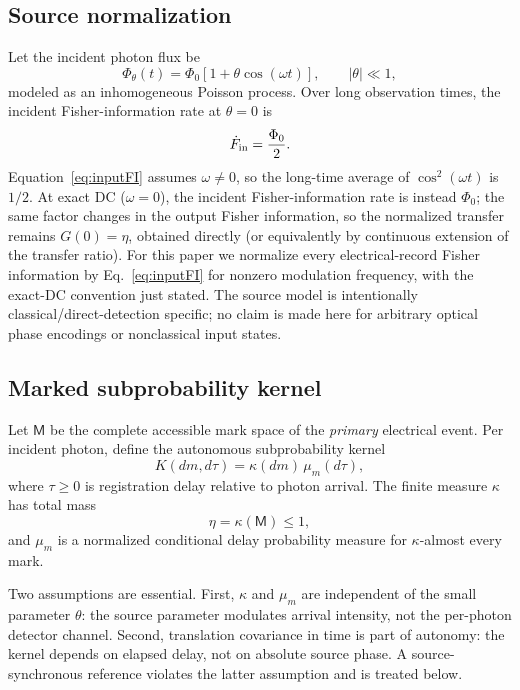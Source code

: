 \documentclass[aps,prapplied,preprint,nofootinbib]{revtex4-2}
\newcommand{\M}{\mathsf M}
\begin{document}
\subsection{Source normalization}

Let the incident photon flux be
\begin{equation}
\Phi_\theta(t)=\Phi_0[1+\theta\cos(\omega t)],\qquad |\theta|\ll1,
\label{eq:source}
\end{equation}
modeled as an inhomogeneous Poisson process. Over long observation times, the incident Fisher-information rate at $\theta=0$ is
\begin{equation}
\dot F_{\rm in}=\frac{\Phi_0}{2}.
\label{eq:inputFI}
\end{equation}
Equation~\eqref{eq:inputFI} assumes $\omega\ne0$, so the long-time average of $\cos^2(\omega t)$ is $1/2$. At exact DC ($\omega=0$), the incident Fisher-information rate is instead $\Phi_0$; the same factor changes in the output Fisher information, so the normalized transfer remains $G(0)=\eta$, obtained directly (or equivalently by continuous extension of the transfer ratio).
For this paper we normalize every electrical-record Fisher information by Eq.~\eqref{eq:inputFI} for nonzero modulation frequency, with the exact-DC convention just stated. The source model is intentionally classical/direct-detection specific; no claim is made here for arbitrary optical phase encodings or nonclassical input states.

\subsection{Marked subprobability kernel}

Let $\M$ be the complete accessible mark space of the \emph{primary} electrical event. Per incident photon, define the autonomous subprobability kernel
\begin{equation}
K(dm,d\tau)=\kappa(dm)\,\mu_m(d\tau),
\label{eq:kernel}
\end{equation}
where $\tau\ge0$ is registration delay relative to photon arrival. The finite measure $\kappa$ has total mass
\begin{equation}
\eta=\kappa(\M)\le1,
\end{equation}
and $\mu_m$ is a normalized conditional delay probability measure for $\kappa$-almost every mark.

Two assumptions are essential. First, $\kappa$ and $\mu_m$ are independent of the small parameter $\theta$: the source parameter modulates arrival intensity, not the per-photon detector channel. Second, translation covariance in time is part of autonomy: the kernel depends on elapsed delay, not on absolute source phase. A source-synchronous reference violates the latter assumption and is treated below.
\end{document}
